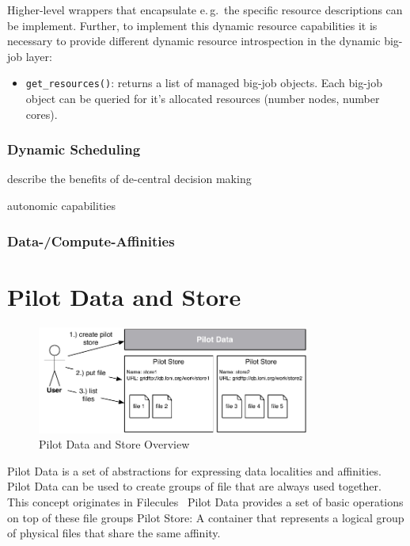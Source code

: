 \documentclass[]{article}
\begin{document}
Higher-level wrappers that encapsulate e.\,g.\ the specific resource
descriptions can be implement. Further, to implement this dynamic resource
capabilities it is necessary to provide different dynamic resource introspection
in the dynamic big-job layer:
\begin{itemize}
    \item \texttt{get\_resources()}: returns a list of managed big-job objects.
     Each big-job object can be queried for it's allocated resources (number 
     nodes, number cores).
\end{itemize}


\subsubsection{Dynamic Scheduling}

describe the benefits of de-central decision making 

autonomic capabilities


\subsubsection{Data-/Compute-Affinities}




\section{Pilot Data and Store}
\label{sec:pilot-data}
\begin{figure}[t]
    \centering
        \includegraphics[width=0.8\textwidth]{figures/pilotstore.pdf}
    \caption{Pilot Data and Store Overview}
    \label{fig:figures_pilotstore}
\end{figure}

Pilot Data is a set of abstractions for expressing data localities and
affinities. Pilot Data can be used to create groups of file that are always used
together. This concept originates in
Filecules~\cite{Doraimani:2008:FGS:1383422.1383429} Pilot Data provides a set of
basic operations on top of these file groups Pilot Store: A container that
represents a logical group of physical files that share the same affinity.
\end{document}

